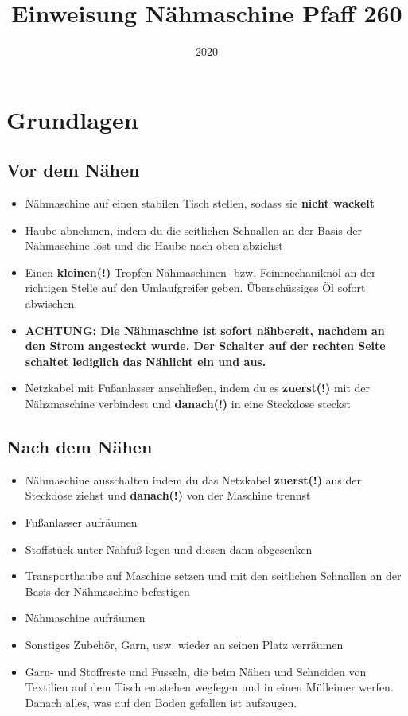 \documentclass{\basedir/fablab-document}
\date{2020}
\author{}
\title{Einweisung Nähmaschine Pfaff 260}
\begin{document}
\maketitle

\section{Grundlagen}

\subsection{Vor dem Nähen}
\begin{itemize}
	\item Nähmaschine auf einen stabilen Tisch stellen, sodass sie \textbf{nicht wackelt}
	\item Haube abnehmen, indem du die seitlichen Schnallen an der Basis der Nähmaschine löst und die Haube nach oben abziehst
	\item Einen \textbf{kleinen(!)} Tropfen Nähmaschinen- bzw. Feinmechaniknöl an der richtigen Stelle auf den Umlaufgreifer geben. Überschüssiges Öl sofort abwischen.
	\item \textbf{ACHTUNG: Die Nähmaschine ist sofort nähbereit, nachdem an den Strom angesteckt wurde. Der Schalter auf der rechten Seite schaltet lediglich das Nählicht ein und aus.}
	\item Netzkabel mit Fußanlasser anschließen, indem du es \textbf{zuerst(!)} mit der Nähzmaschine verbindest und \textbf{danach(!)} in eine Steckdose steckst 
\end{itemize}

\subsection{Nach dem Nähen}
\begin{itemize}
	\item Nähmaschine ausschalten indem du das Netzkabel \textbf{zuerst(!)} aus der Steckdose ziehst und \textbf{danach(!)} von der Maschine trennst
	\item Fußanlasser aufräumen
	\item Stoffstück unter Nähfuß legen und diesen dann abgesenken
	\item Transporthaube auf Maschine setzen und mit den seitlichen Schnallen an der Basis der Nähmaschine befestigen
	\item Nähmaschine aufräumen
	\item Sonstiges Zubehör, Garn, usw. wieder an seinen Platz verräumen
	\item Garn- und Stoffreste und Fusseln, die beim Nähen und Schneiden von Textilien auf dem Tisch entstehen wegfegen und in einen Mülleimer werfen. Danach alles, was auf den Boden gefallen ist aufsaugen.
\end{itemize}
\end{document}
